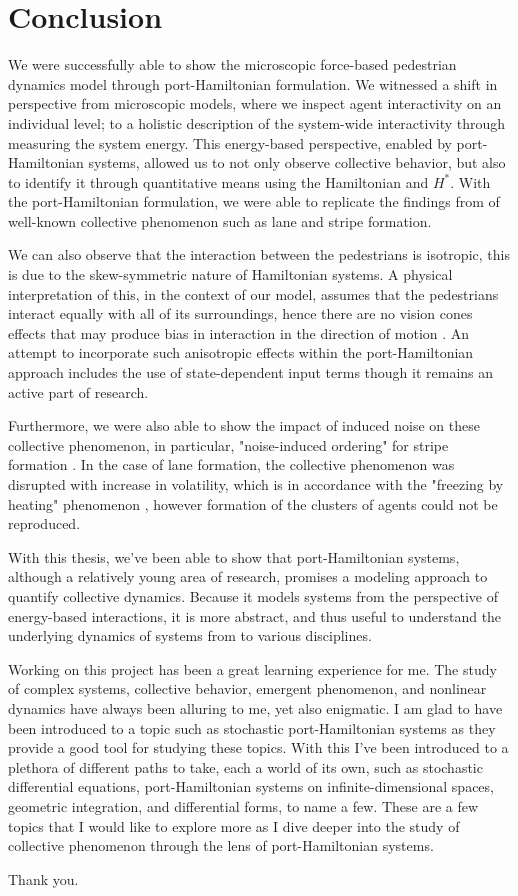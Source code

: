 \section{Conclusion}

We were successfully able to show the microscopic force-based pedestrian dynamics model through port-Hamiltonian formulation. We witnessed a shift in perspective from microscopic models, where we inspect agent interactivity on an individual level; to a holistic description of the system-wide interactivity through measuring the system energy. This energy-based perspective, enabled by port-Hamiltonian systems, allowed us to not only observe collective behavior, but also to identify it through quantitative means using the Hamiltonian and $H^*$. With the port-Hamiltonian formulation, we were able to replicate the findings from \cite{tordeux2022multi} of well-known collective phenomenon such as lane and stripe formation. 

We can also observe that the interaction between the pedestrians is isotropic, this is due to the skew-symmetric nature of Hamiltonian systems. A physical interpretation of this, in the context of our model, assumes that the pedestrians interact equally with all of its surroundings, hence there are no vision cones effects that may produce bias in interaction in the direction of motion \cite{helbing1995social}. An attempt to incorporate such anisotropic effects within the port-Hamiltonian approach includes the use of state-dependent input terms \cite{tordeux2022multi} though it remains an active part of research.

Furthermore, we were also able to show the impact of induced noise on these collective phenomenon, in particular, "noise-induced ordering" for stripe formation \cite{khelfa2021initiating,d2021canard}. In the case of lane formation, the collective phenomenon was disrupted with increase in volatility, which is in accordance with the "freezing by heating" phenomenon \cite{helbing2000freezing}, however formation of the clusters of agents could not be reproduced.

With this thesis, we've been able to show that port-Hamiltonian systems, although a relatively young area of research, promises a modeling approach to quantify collective dynamics. Because it models systems from the perspective of energy-based interactions, it is more abstract, and thus useful to understand the underlying dynamics of systems from to various disciplines.

Working on this project has been a great learning experience for me. The study of complex systems, collective behavior, emergent phenomenon, and nonlinear dynamics have always been alluring to me, yet also enigmatic. I am glad to have been introduced to a topic such as stochastic port-Hamiltonian systems as they provide a good tool for studying these topics. With this I've been introduced to a plethora of different paths to take, each a world of its own, such as stochastic differential equations, port-Hamiltonian systems on infinite-dimensional spaces, geometric integration, and differential forms, to name a few. These are a few topics that I would like to explore more as I dive deeper into the study of collective phenomenon through the lens of port-Hamiltonian systems.

Thank you.